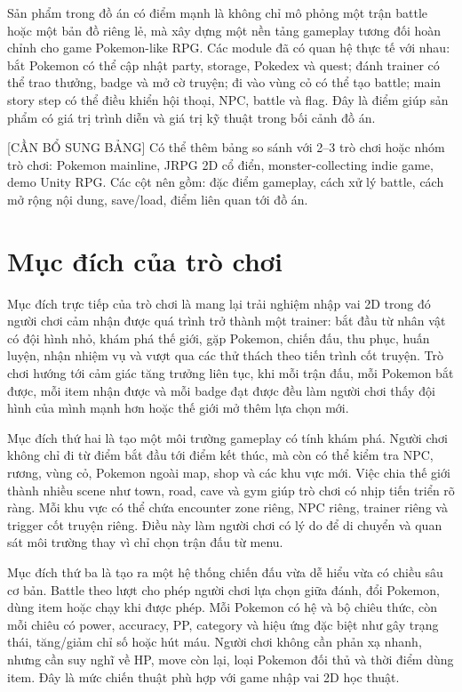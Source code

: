 Sản phẩm trong đồ án có điểm mạnh là không chỉ mô phỏng một trận battle hoặc một bản đồ riêng lẻ, mà xây dựng một nền tảng gameplay tương đối hoàn chỉnh cho game Pokemon-like RPG. Các module đã có quan hệ thực tế với nhau: bắt Pokemon có thể cập nhật party, storage, Pokedex và quest; đánh trainer có thể trao thưởng, badge và mở cờ truyện; đi vào vùng cỏ có thể tạo battle; main story step có thể điều khiển hội thoại, NPC, battle và flag. Đây là điểm giúp sản phẩm có giá trị trình diễn và giá trị kỹ thuật trong bối cảnh đồ án.

[CẦN BỔ SUNG BẢNG] Có thể thêm bảng so sánh với 2--3 trò chơi hoặc nhóm trò chơi: Pokemon mainline, JRPG 2D cổ điển, monster-collecting indie game, demo Unity RPG. Các cột nên gồm: đặc điểm gameplay, cách xử lý battle, cách mở rộng nội dung, save/load, điểm liên quan tới đồ án.

\section{Mục đích của trò chơi}

Mục đích trực tiếp của trò chơi là mang lại trải nghiệm nhập vai 2D trong đó người chơi cảm nhận được quá trình trở thành một trainer: bắt đầu từ nhân vật có đội hình nhỏ, khám phá thế giới, gặp Pokemon, chiến đấu, thu phục, huấn luyện, nhận nhiệm vụ và vượt qua các thử thách theo tiến trình cốt truyện. Trò chơi hướng tới cảm giác tăng trưởng liên tục, khi mỗi trận đấu, mỗi Pokemon bắt được, mỗi item nhận được và mỗi badge đạt được đều làm người chơi thấy đội hình của mình mạnh hơn hoặc thế giới mở thêm lựa chọn mới.

Mục đích thứ hai là tạo một môi trường gameplay có tính khám phá. Người chơi không chỉ đi từ điểm bắt đầu tới điểm kết thúc, mà còn có thể kiểm tra NPC, rương, vùng cỏ, Pokemon ngoài map, shop và các khu vực mới. Việc chia thế giới thành nhiều scene như town, road, cave và gym giúp trò chơi có nhịp tiến triển rõ ràng. Mỗi khu vực có thể chứa encounter zone riêng, NPC riêng, trainer riêng và trigger cốt truyện riêng. Điều này làm người chơi có lý do để di chuyển và quan sát môi trường thay vì chỉ chọn trận đấu từ menu.

Mục đích thứ ba là tạo ra một hệ thống chiến đấu vừa dễ hiểu vừa có chiều sâu cơ bản. Battle theo lượt cho phép người chơi lựa chọn giữa đánh, đổi Pokemon, dùng item hoặc chạy khi được phép. Mỗi Pokemon có hệ và bộ chiêu thức, còn mỗi chiêu có power, accuracy, PP, category và hiệu ứng đặc biệt như gây trạng thái, tăng/giảm chỉ số hoặc hút máu. Người chơi không cần phản xạ nhanh, nhưng cần suy nghĩ về HP, move còn lại, loại Pokemon đối thủ và thời điểm dùng item. Đây là mức chiến thuật phù hợp với game nhập vai 2D học thuật.

